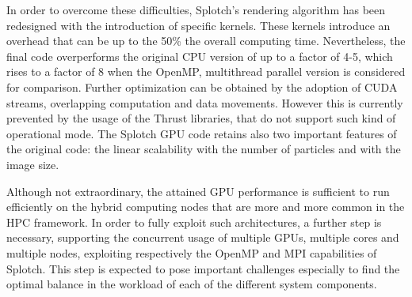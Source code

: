 \documentclass[11pt]{article}
\begin{document}
In order to overcome these difficulties, Splotch's rendering algorithm has been
redesigned with the introduction of specific kernels. These kernels 
introduce an overhead that can be up to the 50\% the overall computing
time. Nevertheless, the final code overperforms the original CPU
version of up to a factor of 4-5, which rises to a factor of 8 when the OpenMP,
multithread parallel version is considered for comparison. Further optimization can
be obtained by the adoption of CUDA streams, overlapping computation 
and data movements. However this is currently prevented by the usage of the 
Thrust libraries, that do not support such kind of operational mode. 
The Splotch GPU code retains also two important features of the original
code: the linear scalability with the number of particles and with the 
image size. 

Although not extraordinary, the attained GPU performance is sufficient 
to run efficiently on the hybrid computing nodes that are more and 
more common in the HPC framework. In order to fully exploit such architectures, 
a further step is necessary, supporting the concurrent usage of 
multiple GPUs, multiple cores and multiple nodes, exploiting respectively the OpenMP and
MPI capabilities of Splotch. This step is expected to pose important 
challenges especially to find the optimal balance in the workload of each of the different 
system components.


	
\end{document}
